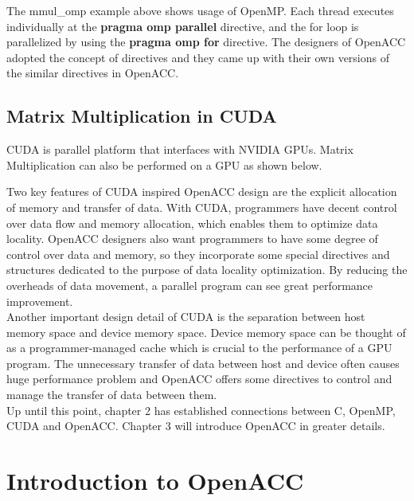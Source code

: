 \documentclass[ebook,10pt,oneside,openany]{memoir}
\begin{document}


The mmul\_omp example above shows usage of OpenMP. Each thread executes individually at the \textbf{pragma omp parallel} directive, and the for loop is parallelized by using the \textbf{pragma omp for} directive. The designers of OpenACC adopted the concept of directives and they came up with their own versions of the similar directives in OpenACC. \\

\section{Matrix Multiplication in CUDA}

CUDA is parallel platform that interfaces with NVIDIA GPUs. Matrix Multiplication can also be performed on a GPU as shown below.



Two key features of CUDA inspired OpenACC design are the explicit allocation of memory and transfer of data. With CUDA, programmers have decent control over data flow and memory allocation, which enables them to optimize data locality. OpenACC designers also want programmers to have some degree of control over data and memory, so they incorporate some special directives and structures dedicated to the purpose of data locality optimization. By reducing the overheads of data movement, a parallel program can see great performance improvement. \\

Another important design detail of CUDA is the separation between host memory space and device memory space. Device memory space can be thought of as a programmer-managed cache which is crucial to the performance of a GPU program. The unnecessary transfer of data between host and device often causes huge performance problem and OpenACC offers some directives to control and manage the transfer of data between them. \\

Up until this point, chapter 2 has established connections between C, OpenMP, CUDA and OpenACC. Chapter 3 will introduce OpenACC in greater details.


\chapter{Introduction to OpenACC}
\end{document}
